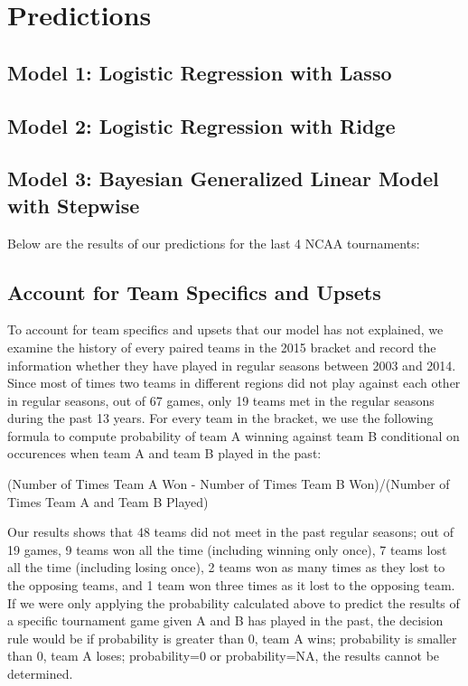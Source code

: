 \documentclass{article} %
\begin{document}
\section{Predictions}

\subsection{Model 1: Logistic Regression with Lasso}

\subsection{Model 2: Logistic Regression with Ridge}

\subsection{Model 3: Bayesian Generalized Linear Model with Stepwise}

Below are the results of our predictions for the last 4 NCAA tournaments:\





\subsection{Account for Team Specifics and Upsets}

To account for team specifics and upsets that our model has not explained, we examine the history of every paired teams in the 2015 bracket and record the information whether they have played in regular seasons between 2003 and 2014. Since most of times two teams in different regions did not play against each other in regular seasons, out of 67 games, only 19 teams met in the regular seasons during the past 13 years. For every team in the bracket, we use the following formula to compute probability of team A winning against team B conditional on occurences when team A and team B played in the past:

(Number of Times Team A Won - Number of Times Team B Won)/(Number of Times Team A and Team B Played)


Our results shows that 48 teams did not meet in the past regular seasons; out of 19 games, 9 teams won all the time (including winning only once), 7 teams lost all the time (including losing once), 2 teams won as many times as they lost to the opposing teams, and 1 team won three times as it lost to the opposing team. If we were only applying the probability calculated above to predict the results of a specific tournament game given A and B has played in the past, the decision rule would be if probability is greater than 0, team A wins; probability is smaller than 0, team A loses; probability=0 or probability=NA, the results cannot be determined. 
\end{document}
